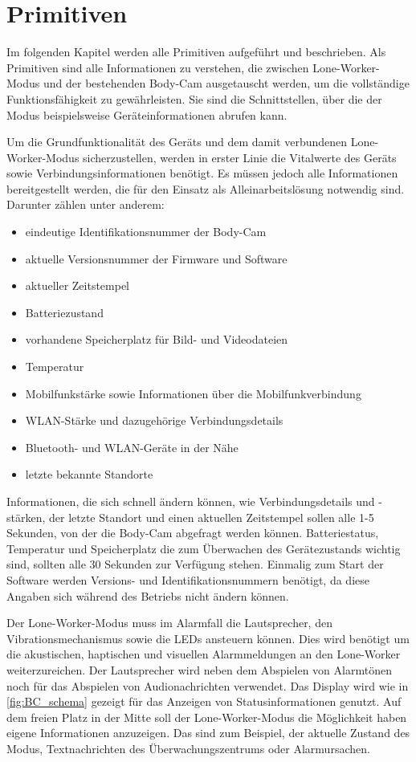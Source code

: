 \documentclass[thesis.tex]{subfiles}
\begin{document}
\section{Primitiven}\label{chap:primitiven}
Im folgenden Kapitel werden alle Primitiven aufgeführt und beschrieben.
Als Primitiven sind alle Informationen zu verstehen, die zwischen Lone-Worker-Modus und der bestehenden Body-Cam ausgetauscht werden, um die vollständige Funktionsfähigkeit zu gewährleisten.
Sie sind die Schnittstellen, über die der Modus beispielsweise Geräteinformationen abrufen kann.

Um die Grundfunktionalität des Geräts und dem damit verbundenen Lone-Worker-Modus sicherzustellen, werden in erster Linie
die Vitalwerte des Geräts sowie Verbindungsinformationen benötigt.
Es müssen jedoch alle Informationen bereitgestellt werden, die für den Einsatz als Alleinarbeitslösung notwendig sind.
Darunter zählen unter anderem:
\begin{itemize}
    \item eindeutige Identifikationsnummer der Body-Cam
    \item aktuelle Versionsnummer der Firmware und Software
    \item aktueller Zeitstempel
    \item Batteriezustand
    \item vorhandene Speicherplatz für Bild- und Videodateien
    \item Temperatur
    \item Mobilfunkstärke sowie Informationen über die Mobilfunkverbindung
    \item WLAN-Stärke und dazugehörige Verbindungsdetails
    \item Bluetooth- und WLAN-Geräte in der Nähe
    \item letzte bekannte Standorte
\end{itemize}

Informationen, die sich schnell ändern können, wie Verbindungsdetails und -stärken, der letzte Standort und
einen aktuellen Zeitstempel sollen alle 1-5 Sekunden, von der die Body-Cam abgefragt werden können.
Batteriestatus, Temperatur und Speicherplatz die zum Überwachen des Gerätezustands wichtig sind, sollten alle 30 Sekunden zur Verfügung stehen.
Einmalig zum Start der Software werden Versions- und Identifikationsnummern benötigt, da diese Angaben sich während des Betriebs nicht ändern können.

Der Lone-Worker-Modus muss im Alarmfall die Lautsprecher, den Vibrationsmechanismus sowie die LEDs ansteuern können.
Dies wird benötigt um die akustischen, haptischen und visuellen Alarmmeldungen an den Lone-Worker weiterzureichen.
Der Lautsprecher wird neben dem Abspielen von Alarmtönen noch für das Abspielen von Audionachrichten verwendet.
Das Display wird wie in \autoref{fig:BC_schema} gezeigt für das Anzeigen von Statusinformationen genutzt.
Auf dem freien Platz in der Mitte soll der Lone-Worker-Modus die Möglichkeit haben eigene Informationen anzuzeigen.
Das sind zum Beispiel, der aktuelle Zustand des Modus, Textnachrichten des Überwachungszentrums oder Alarmursachen.
\end{document}
